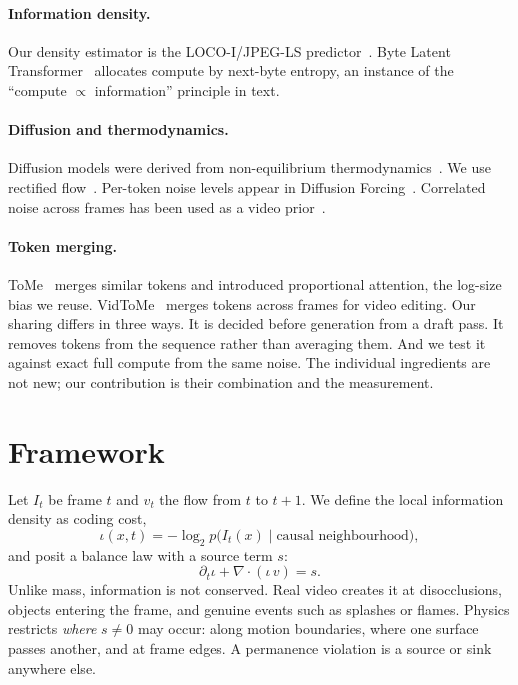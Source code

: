 \documentclass[10pt,twocolumn,letterpaper]{article}
\begin{document}
\paragraph{Information density.} Our density estimator is the LOCO-I/JPEG-LS predictor~\cite{weinberger2000loco}. Byte Latent Transformer~\cite{pagnoni2024blt} allocates compute by next-byte entropy, an instance of the ``compute $\propto$ information'' principle in text.
\paragraph{Diffusion and thermodynamics.} Diffusion models were derived from non-equilibrium thermodynamics~\cite{sohl2015deep}. We use rectified flow~\cite{liu2023flow,lipman2023flow}. Per-token noise levels appear in Diffusion Forcing~\cite{chen2024diffusion}. Correlated noise across frames has been used as a video prior~\cite{ge2023preserve}.
\paragraph{Token merging.} ToMe~\cite{bolya2023token,bolya2023tomesd} merges similar tokens and introduced proportional attention, the log-size bias we reuse. VidToMe~\cite{li2024vidtome} merges tokens across frames for video editing. Our sharing differs in three ways. It is decided before generation from a draft pass. It removes tokens from the sequence rather than averaging them. And we test it against exact full compute from the same noise. The individual ingredients are not new; our contribution is their combination and the measurement.

\section{Framework}\label{sec:framework}
Let $I_t$ be frame $t$ and $v_t$ the flow from $t$ to $t{+}1$. We define the local information density as coding cost,
\begin{equation}
\iota(x,t) = -\log_2 p\big(I_t(x)\mid \text{causal neighbourhood}\big),
\end{equation}
and posit a balance law with a source term $s$:
\begin{equation}
\partial_t \iota + \nabla\!\cdot(\iota\, v) = s .
\end{equation}
Unlike mass, information is not conserved. Real video creates it at disocclusions, objects entering the frame, and genuine events such as splashes or flames. Physics restricts \emph{where} $s\neq 0$ may occur: along motion boundaries, where one surface passes another, and at frame edges. A permanence violation is a source or sink anywhere else.
\end{document}
